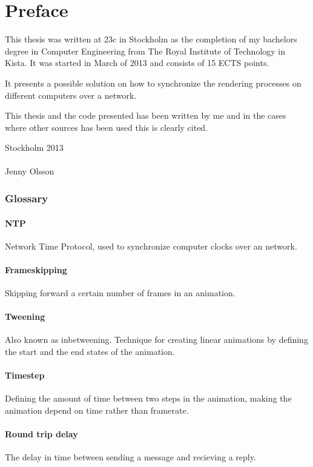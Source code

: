 \chapter{Preface}

This thesis was written at 23c in Stockholm as the completion of my bachelors degree in Computer Engineering from The Royal Institute of Technology in Kista. It was started in March of 2013 and consists of 15 ECTS points. 

It presents a possible solution on how to synchronize the rendering processes on different computers over a network. 

This thesis and the code presented has been written by me and in the cases where other sources has been used this is clearly cited. 


\vspace{20mm}
\mbox{}\hfill
\begin{minipage}[t]{80mm}
  Stockholm 2013\\
  \vspace{1cm}\\
  Jenny Olsson
\end{minipage}

\subsection*{Glossary}

\subsubsection*{NTP}
Network Time Protocol, used to synchronize computer clocks over an network. 

\subsubsection*{Frameskipping}
Skipping forward a certain number of frames in an animation.

\subsubsection*{Tweening}
Also known as inbetweening. Technique for creating linear animations by defining the start and the end states of the animation. 

\subsubsection*{Timestep}
Defining the amount of time between two steps in the animation, making the animation depend on time rather than framerate.

\subsubsection*{Round trip delay}
The delay in time between sending a message and recieving a reply. 
